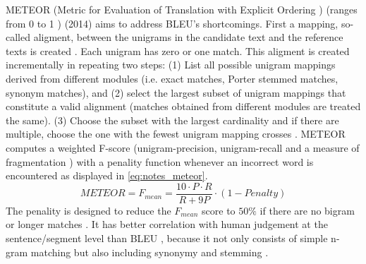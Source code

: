 METEOR (Metric for Evaluation of Translation with Explicit Ordering \citep{palivela_optimization_2021,banerjee_METEOR_2005}) 
(ranges from 0 to 1 \citep{kurt_pehlivanoglu_comparative_2024}) (2014) aims to address BLEU's shortcomings.
First a mapping, so-called aligment, between the unigrams in the candidate text and the reference texts is created \citep{banerjee_METEOR_2005}.
Each unigram has zero or one match.
This aligment is created incrementally in repeating two steps:
(1) List all possible unigram mappings derived from different modules (i.e. exact matches, Porter stemmed matches, synonym matches), 
and (2) select the largest subset of unigram mappings that constitute a valid alignment (matches obtained from different modules are treated the same).
(3) Choose the subset with the largest cardinality and if there are multiple, choose the one with the fewest unigram mapping crosses \citep{banerjee_METEOR_2005}.
METEOR computes a weighted F-score 
(unigram-precision, unigram-recall \citep{kurt_pehlivanoglu_comparative_2024,banerjee_METEOR_2005} 
and a measure of fragmentation \citep{banerjee_METEOR_2005,kurt_pehlivanoglu_comparative_2024})
with a penality function whenever an incorrect word is encountered \citep{palivela_optimization_2021} as displayed in \autoref{eq:notes_meteor}.
\begin{equation}
    METEOR = F_{mean} = \frac{10 \cdot P \cdot R}{R + 9P} \cdot (1 - Penalty)
\label{eq:notes_meteor}
\end{equation}
The penality is designed to reduce the $F_{mean}$ score to $50\%$ if there are no bigram or longer matches \citep{banerjee_METEOR_2005}.
It has better correlation with human judgement at the sentence/segment level than BLEU \citep{zhou_paraphrase_2021}, 
because it not only consists of simple n-gram matching but also including synonymy and stemming \citep{kurt_pehlivanoglu_comparative_2024}.

